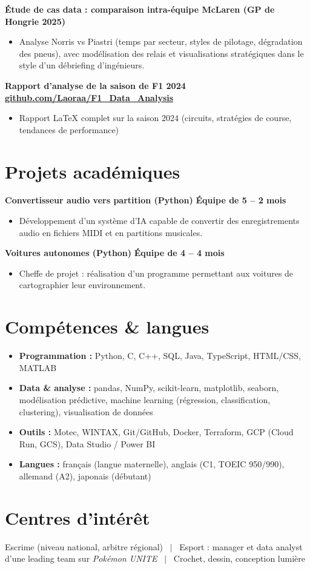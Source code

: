 \documentclass[10pt,a4paper]{article}
\newcommand{\entryone}[2]{%
  \textbf{#1} \hfill \textbf{#2}\par\vspace{-2pt}
}
\begin{document}
\entryone{Étude de cas data : comparaison intra-équipe McLaren (GP de Hongrie 2025)}{}
\begin{itemize}
  \item Analyse Norris vs Piastri (temps par secteur, styles de pilotage, dégradation des pneus), avec modélisation des relais et visualisations stratégiques dans le style d'un débriefing d'ingénieurs.
\end{itemize}

\vspace{2pt}
\entryone{Rapport d'analyse de la saison de F1 2024}{\href{https://github.com/Laoraa/F1_Data_Analysis}{\normalfont\small github.com/Laoraa/F1\_Data\_Analysis}}
\begin{itemize}
  \item Rapport \LaTeX{} complet sur la saison 2024 (circuits, stratégies de course, tendances de performance)
\end{itemize}

\section{Projets académiques}

\entryone{Convertisseur audio vers partition (Python)}{Équipe de 5 -- 2 mois}
\begin{itemize}
  \item Développement d'un système d'IA capable de convertir des enregistrements audio en fichiers MIDI et en partitions musicales.
\end{itemize}

\vspace{2pt}
\entryone{Voitures autonomes (Python)}{Équipe de 4 -- 4 mois}
\begin{itemize}
  \item Cheffe de projet : réalisation d'un programme permettant aux voitures de cartographier leur environnement.
\end{itemize}

\section{Compétences \& langues}
\begin{itemize}[label={}, leftmargin=0pt, itemsep=2pt]
  \item \textbf{Programmation :} Python, C, C++, SQL, Java, TypeScript, HTML/CSS, MATLAB
  \item \textbf{Data \& analyse :} pandas, NumPy, scikit-learn, matplotlib, seaborn, modélisation prédictive, machine learning (régression, classification, clustering), visualisation de données
  \item \textbf{Outils :} Motec, WINTAX, Git/GitHub, Docker, Terraform, GCP (Cloud Run, GCS), Data Studio / Power BI
  \item \textbf{Langues :} français (langue maternelle), anglais (C1, TOEIC 950/990), allemand (A2), japonais (débutant)
\end{itemize}

\section{Centres d'intérêt}
Escrime (niveau national, arbitre régional) \ $|$ \ Esport : manager et data analyst d'une leading team sur \textit{Pok\'emon UNITE} \ $|$ \ Crochet, dessin, conception lumière
\end{document}
